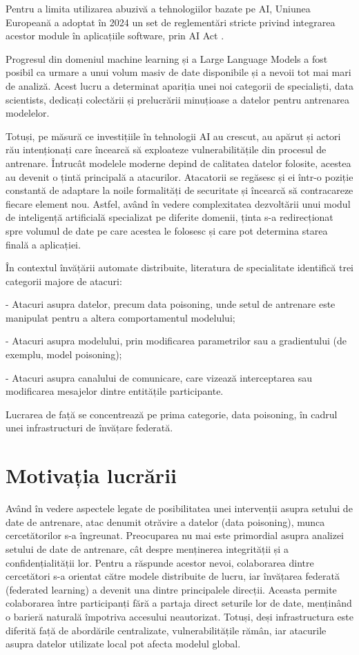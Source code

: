 \documentclass[../../main.tex]{subfiles}
\begin{document}
Pentru a limita utilizarea abuzivă a tehnologiilor bazate pe AI, Uniunea Europeană a adoptat în 2024 un set de reglementări stricte privind integrarea acestor module în aplicațiile software, prin AI Act \cite{eu_ai_act_overview_2024}.

Progresul din domeniul machine learning și a Large Language Models a fost posibil ca urmare a unui volum masiv de date disponibile și a nevoii tot mai mari de analiză.
Acest lucru a determinat apariția unei noi categorii de specialiști, data scientists, dedicați colectării și prelucrării minuțioase a datelor pentru antrenarea modelelor.

Totuși, pe măsură ce investițiile în tehnologii AI au crescut, au apărut și actori rău intenționați care încearcă să exploateze vulnerabilitățile din procesul de antrenare.
Întrucât modelele moderne depind de calitatea datelor folosite, acestea au devenit o țintă principală a atacurilor.
Atacatorii se regăsesc și ei într-o poziție constantă de adaptare la noile formalități de securitate și încearcă să contracareze fiecare element nou.
Astfel, având în vedere complexitatea dezvoltării unui modul de inteligență artificială specializat pe diferite domenii, ținta s-a redirecționat spre volumul de date pe care acestea le folosesc și care pot determina starea finală a aplicației.

În contextul învățării automate distribuite, literatura de specialitate identifică trei categorii majore de atacuri:

- Atacuri asupra datelor, precum data poisoning, unde setul de antrenare este manipulat pentru a altera comportamentul modelului;

- Atacuri asupra modelului, prin modificarea parametrilor sau a gradientului (de exemplu, model poisoning);

- Atacuri asupra canalului de comunicare, care vizează interceptarea sau modificarea mesajelor dintre entitățile participante.

Lucrarea de față se concentrează pe prima categorie, data poisoning, în cadrul unei infrastructuri de învățare federată.

\section{Motivația lucrării}

Având în vedere aspectele legate de posibilitatea unei intervenții asupra setului de date de antrenare, atac denumit otrăvire a datelor (data poisoning),
munca cercetătorilor s-a îngreunat. Preocuparea nu mai este primordial asupra analizei setului de date de antrenare, cât despre menținerea integrității și a confidențialității lor.
Pentru a răspunde acestor nevoi, colaborarea dintre cercetători s-a orientat către modele distribuite de lucru, iar învățarea federată (federated learning) a devenit una dintre principalele direcții.
Aceasta permite colaborarea între participanți fără a partaja direct seturile lor de date, menținând o barieră naturală împotriva accesului neautorizat. Totuși, deși infrastructura este diferită față de abordările centralizate, vulnerabilitățile rămân, iar atacurile asupra datelor utilizate local pot afecta modelul global.
\end{document}

